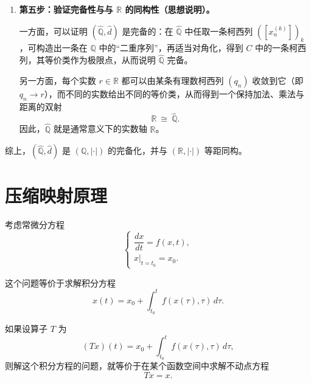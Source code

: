 \begin{example}[有理数域的完备化]
\begin{enumerate}
  \item \textbf{第五步：验证完备性与与 $\mathbb{R}$ 的同构性（思想说明）。}

  一方面，可以证明 $(\widehat{\mathbb{Q}},\widehat d)$ 是完备的：在 $\widehat{\mathbb{Q}}$ 中任取一条柯西列 $([x_n^{(k)}])_{k}$，可构造出一条在 $\mathbb{Q}$ 中的“二重序列”，再适当对角化，得到 $C$ 中的一条柯西列，其等价类作为极限点，从而说明 $\widehat{\mathbb{Q}}$ 完备。

  另一方面，每个实数 $r\in\mathbb{R}$ 都可以由某条有理数柯西列 $(q_n)$ 收敛到它（即 $q_n\to r$），而不同的实数给出不同的等价类，从而得到一个保持加法、乘法与距离的双射
  \[
    \mathbb{R}\ \cong\ \widehat{\mathbb{Q}}.
  \]
  因此，$\widehat{\mathbb{Q}}$ 就是通常意义下的实数轴 $\mathbb{R}$。
\end{enumerate}
综上，$(\widehat{\mathbb{Q}},\widehat d)$ 是 $(\mathbb{Q},|\cdot|)$ 的完备化，并与 $(\mathbb{R},|\cdot|)$ 等距同构。
\end{example}
\section{压缩映射原理}
考虑常微分方程
\[
\begin{cases}
\dfrac{dx}{dt} = f(x,t), \\[6pt]
x\big|_{t=t_0} = x_0.
\end{cases}
\]

这个问题等价于求解积分方程
\[
x(t) = x_0 + \int_{t_0}^t f(x(\tau), \tau) \, d\tau.
\]

如果设算子 $T$ 为
\[
(Tx)(t) = x_0 + \int_{t_0}^t f(x(\tau), \tau) \, d\tau,
\]
则解这个积分方程的问题，就等价于在某个函数空间中求解不动点方程
\[
Tx = x.
\]

